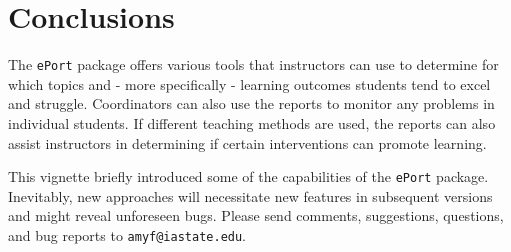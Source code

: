 \documentclass[11pt,a4paper,oldfontcommands,openany]{memoir}
\numberwithin{equation}{section} %
\newcommand{\pkg}[1]{{\texttt{#1}}}
\begin{document}
\chapter{Conclusions}

The \pkg{ePort} package offers various tools that instructors can use to determine for which topics and - more specifically - learning outcomes students tend to excel and struggle. Coordinators can also use the reports to monitor any problems in individual students. If different teaching methods are used, the reports can also assist instructors in determining if certain interventions can promote learning.

This vignette briefly introduced some of the capabilities of the \pkg{ePort} package. Inevitably, new approaches will necessitate new features in subsequent versions and might reveal unforeseen bugs. Please send comments, suggestions, questions, and bug reports to \texttt{amyf@iastate.edu}.
\end{document}
